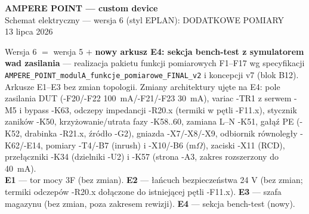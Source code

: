 \documentclass[10pt,a4paper,landscape]{article}
\newcommand{\ohm}{$\Omega$}
\begin{document}
\begin{center}
\vspace*{1.6cm}
{\LARGE\bfseries AMPERE POINT --- custom device}\\[6pt]
{\Large Schemat elektryczny --- wersja 6 (styl EPLAN): DODATKOWE POMIARY}\\[10pt]
{\normalsize 13 lipca 2026}\\[12pt]
\begin{minipage}{0.88\textwidth}\small
Wersja 6 $=$ wersja 5 $+$ \textbf{nowy arkusz E4: sekcja bench-test z symulatorem wad zasilania}
--- realizacja pakietu funkcji pomiarowych F1--F17 wg specyfikacji
\texttt{AMPERE\_POINT\_modulA\_funkcje\_pomiarowe\_FINAL\_v2} i koncepcji v7 (blok B12).
Arkusze E1--E3 bez zmian topologii. Zmiany architektury ujęte na E4: pole zasilania DUT
(-F20/-F22 100~mA/-F21/-F23 30~mA), variac -TR1 z serwem -M5 i bypass -K63, odczepy impedancji
-R20.x (termiki w pętli -F11.x), stycznik zaników -K50, krzyżowanie/utrata fazy -K58..60,
zamiana L--N -K51, gałąź PE (-K52, drabinka -R21.x, źródło -G2), gniazda -X7/-X8/-X9,
odbiornik równoległy -K62/-E14, pomiary -T4/-B7 (inrush) i -X10/-B6 (m\ohm), zaciski -X11 (RCD),
przełączniki -K34 (dzielniki -U2) i -K57 (strona -A3, zakres rozszerzony do 40~mA).\\[6pt]
\textbf{E1} --- tor mocy 3F (bez zmian). \textbf{E2} --- łańcuch bezpieczeństwa 24 V (bez zmian;
termiki odczepów -R20.x dołączone do istniejącej pętli -F11.x). \textbf{E3} --- szafa magazynu
(bez zmian, poza zakresem rewizji). \textbf{E4} --- sekcja bench-test (nowy).
\end{minipage}
\end{center}
\newpage
\end{document}
